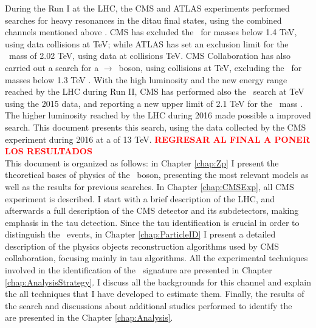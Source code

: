 
During the Run I at the LHC, the CMS and ATLAS experiments performed searches for heavy resonances 
in the ditau final states, using the combined channels mentioned above \cite{CMSZprime2ditaubib,ATLASZprime2ditaubib}.
CMS has excluded the \ZprimeSSM~for masses below 1.4 TeV, using data collisions at  TeV; while ATLAS 
has set an exclusion limit for the \ZprimeSSM~mass of 2.02 TeV, using data at collisions  TeV. 
CMS Collaboration has also carried out a search for a \Zprime$\rightarrow$\taue\taumu~boson, using collisions at  TeV, excluding
the \ZprimeSSM~for masses below 1.3 TeV \cite{CMSZprime2ditauelectronmuonbib}. With the high luminosity and the new energy range 
reached by the LHC during Run II, CMS has performed also the \Zprimetotautau~search at  TeV using the 2015 data, and reporting 
a new upper limit of 2.1 TeV for the \ZprimeSSM~mass \cite{CMSZprime2tausRunII}. The higher luminosity reached 
by the LHC during 2016 made possible a improved search. This document presents this search, using 
the data collected by the CMS experiment during 2016 at a \centermassenergy of 13 TeV. \textbf{\textcolor{red}{REGRESAR AL FINAL A PONER LOS RESULTADOS}}\\


This document is organized as follows: in Chapter \ref{chap:Zp} I present the theoretical bases of physics of 
the \Zprime~boson, presenting the most relevant models as well as the results for previous searches. In 
Chapter \ref{chap:CMSExp}, all CMS experiment is described. I start with a brief description 
of the LHC, and afterwards a full description of the CMS detector and its subdetectors, making emphasis 
in the tau detection. Since the tau identification is crucial in order to distinguish the \Zprime~events, in Chapter \ref{chap:ParticleID}
I present a detailed description of the physics objects reconstruction algorithms used
by CMS collaboration, focusing mainly in tau algorithms. All the experimental techniques involved in the 
identification of the \Zprimetotauh~signature are presented in Chapter \ref{chap:AnalysisStrategy}. 
I discuss all the backgrounds for this channel and explain the all techniques that I have developed 
to estimate them. Finally, the results of the search and discussions about additional studies performed to identify the \Zprime~ 
are presented in the Chapter \ref{chap:Analysis}.


